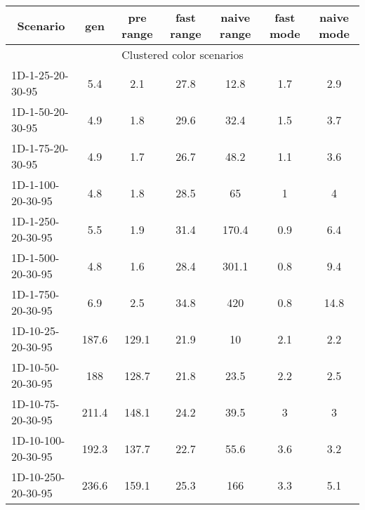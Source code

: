 \documentclass{article}
\begin{document}
    \begin{table}[h]
        \hskip0.8cm
        \begin{center}
        \begin{tabular}{|l||c|c|c|c|c|c|}
            \hline
            \multicolumn{1}{|c|}{Scenario} & gen     & pre range & fast range & naive range & fast mode & naive mode \\
            \hline
            \hline
            \multicolumn{7}{|c|}{Clustered color scenarios}                                                           \\
            \hline
            1D-1-25-20-30-95                       & 5.4     & 2.1        & 27.8       & 12.8        & 1.7       & 2.9        \\
            1D-1-50-20-30-95                       & 4.9     & 1.8        & 29.6       & 32.4        & 1.5       & 3.7        \\
            1D-1-75-20-30-95                       & 4.9     & 1.7        & 26.7       & 48.2        & 1.1       & 3.6        \\
            1D-1-100-20-30-95                      & 4.8     & 1.8        & 28.5       & 65          & 1         & 4          \\
            1D-1-250-20-30-95                      & 5.5     & 1.9        & 31.4       & 170.4       & 0.9       & 6.4        \\
            1D-1-500-20-30-95                      & 4.8     & 1.6        & 28.4       & 301.1       & 0.8       & 9.4        \\
            1D-1-750-20-30-95                      & 6.9     & 2.5        & 34.8       & 420         & 0.8       & 14.8       \\
            \hline
            1D-10-25-20-30-95                       & 187.6   & 129.1      & 21.9       & 10          & 2.1       & 2.2        \\
            1D-10-50-20-30-95                       & 188     & 128.7      & 21.8       & 23.5        & 2.2       & 2.5        \\
            1D-10-75-20-30-95                       & 211.4   & 148.1      & 24.2       & 39.5        & 3         & 3          \\
            1D-10-100-20-30-95                      & 192.3   & 137.7      & 22.7       & 55.6        & 3.6       & 3.2        \\
            1D-10-250-20-30-95                      & 236.6   & 159.1      & 25.3       & 166         & 3.3       & 5.1        \\

\end{tabular}
\end{center}
\end{table}
\end{document}
